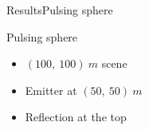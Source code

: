 \documentclass[9pt, xcolor={usenames, dvipsnames}]{beamer}
\begin{document}
				\begin{frame}{Results}{Pulsing sphere}
					\centering
					\begin{minipage}[c]{0.45\textwidth}
						\begin{figure}
						\end{figure}
					\end{minipage}
					\hfill
					\begin{minipage}[c]{0.5\textwidth}
						\begin{exampleblock}{Pulsing sphere}
							\begin{itemize}
								\item $(100,\ 100)\ m$ scene
								\item Emitter at $(50,\ 50)\ m$
								\item Reflection at the top
							\end{itemize}
						\end{exampleblock}
					\end{minipage}
				\end{frame}
\end{document}
